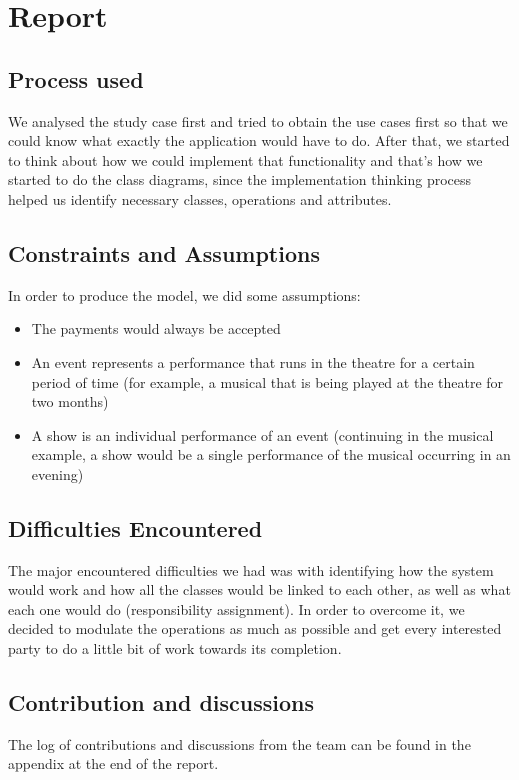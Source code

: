 \chapter{Report}



\section{Process used}
We analysed the study case first and tried to obtain the use cases first so that we could know what exactly the application would have to do. After that, we started to think about how we could implement that functionality and that's how we started to do the class diagrams, since the implementation thinking process helped us identify necessary classes, operations and attributes.

\section{Constraints and Assumptions}
In order to produce the model, we did some assumptions:
\begin{itemize}
  \item The payments would always be accepted
  \item An event represents a performance that runs in the theatre for a certain period of time (for example, a musical that is being played at the theatre for two months)
  \item A show is an individual performance of an event (continuing in the musical example, a show would be a single performance of the musical occurring in an evening)
\end{itemize}

\section{Difficulties Encountered}
The major encountered difficulties we had was with identifying how the system would work and how all the classes would be linked to each other, as well as what each one would do (responsibility assignment). In order to overcome it, we decided to modulate the operations as much as possible and get every interested party to do a little bit of work towards its completion.

\section{Contribution and discussions}
The log of contributions and discussions from the team can be found in the appendix at the end of the report.
